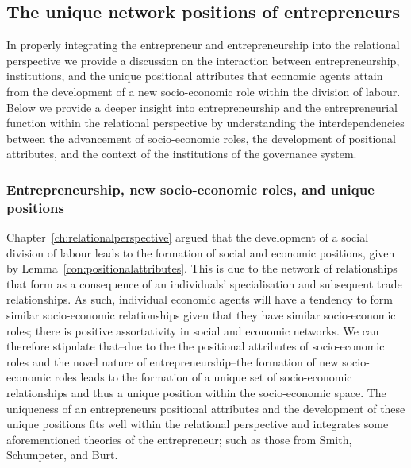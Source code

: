 \subsection{The unique network positions of entrepreneurs}

In properly integrating the entrepreneur and entrepreneurship into the relational perspective we provide a discussion on the interaction between entrepreneurship, institutions, and the unique positional attributes that economic agents attain from the development of a new socio-economic role within the division of labour. Below we provide a deeper insight into entrepreneurship and the entrepreneurial function within the relational perspective by understanding the interdependencies between the advancement of socio-economic roles, the development of positional attributes, and the context of the institutions of the governance system.

\subsubsection{Entrepreneurship, new socio-economic roles, and unique positions}

Chapter~\ref{ch:relationalperspective} argued that the development of a social division of labour leads to the formation of social and economic positions, given by Lemma~\ref{con:positionalattributes}. This is due to the network of relationships that form as a consequence of an individuals' specialisation and subsequent trade relationships. As such, individual economic agents will have a tendency to form similar socio-economic relationships given that they have similar socio-economic roles; there is positive assortativity in social and economic networks. We can therefore stipulate that--due to the the positional attributes of socio-economic roles and the novel nature of entrepreneurship--the formation of new socio-economic roles leads to the formation of a unique set of socio-economic relationships and thus a unique position within the socio-economic space. The uniqueness of an entrepreneurs positional attributes and the development of these unique positions fits well within the relational perspective and integrates some aforementioned theories of the entrepreneur; such as those from Smith, Schumpeter, and Burt.

